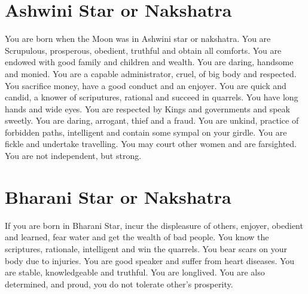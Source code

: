 \documentclass[12pt, right open]{memoir}
\begin{document}

\section{Ashwini Star or Nakshatra}

You are born when the Moon was in Ashwini star or nakshatra. You are Scrupulous, prosperous, obedient, truthful and obtain all comforts. You are endowed with good family and children and wealth. You are daring, handsome and monied. You are a capable administrator, cruel, of big body and respected. You sacrifice money, have a good conduct and an enjoyer. You are quick and candid, a knower of scriputures, rational and succeed in quarrels. You have long hands and wide eyes. You are respected by Kings and governments and speak sweetly. You are daring, arrogant, thief and a fraud. You are unkind, practice of forbidden paths, intelligent and contain some sympal on your girdle. You are fickle and undertake travelling. You may court other women and are farsighted. You are not independent, but strong.


\section{Bharani Star or Nakshatra}

If you are born in Bharani Star, incur the displeasure of others, enjoyer, obedient and learned, fear water and get the wealth of bad people. You know the scriptures, rationale, intelligent and win the quarrels. You bear scars on your body due to injuries. You are good speaker and suffer from heart diseases. You are stable, knowledgeable and truthful. You are longlived. You are also determined, and proud, you do not tolerate other’s prosperity.
\end{document}
